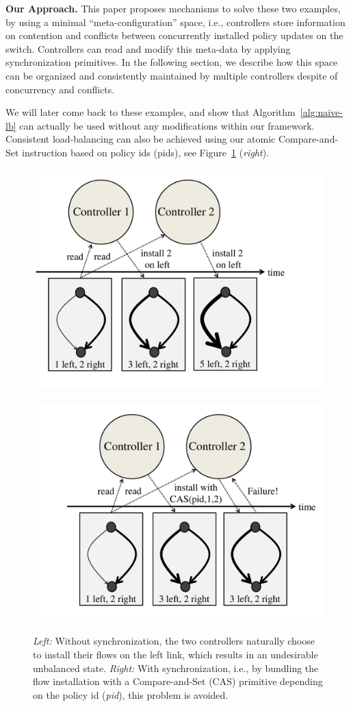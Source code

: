 \documentclass[conference]{sigcomm-alternate}
\begin{document}
\vspace{2mm}
\noindent\textbf{Our Approach.}
This paper proposes mechanisms to solve these two examples,
by using a minimal 
``meta-configuration'' space, i.e., controllers store information 
on contention and conflicts between
concurrently installed policy updates on the switch. Controllers can read and modify
this meta-data by applying synchronization primitives.
In the following section, we
describe how this space can be organized and consistently maintained
by multiple controllers despite of concurrency and conflicts.

We will later come back to these examples, and show that Algorithm~\ref{alg:naive-lb} 
can actually be used without any modifications within our framework. 
Consistent load-balancing can also be achieved using our atomic Compare-and-Set instruction based on policy ids (pids),
see Figure~\ref{fig:CAS-example} (\emph{right}).

\begin{figure}[t]
\centering
\includegraphics[width=.56\columnwidth]{loadbal-1.pdf}~\hspace{-.7cm}~\includegraphics[width=.56\columnwidth]{loadbal-2.pdf}\\
\caption{\emph{Left:} Without synchronization, the two controllers naturally choose to
install their flows on the left link, which results in an undesirable
unbalanced state.
 \emph{Right:}
 With synchronization, i.e., by bundling the flow installation with a Compare-and-Set (CAS) primitive
 depending on the policy id (\emph{pid}), this problem is avoided.}\label{fig:CAS-example}
\end{figure}
\end{document}
